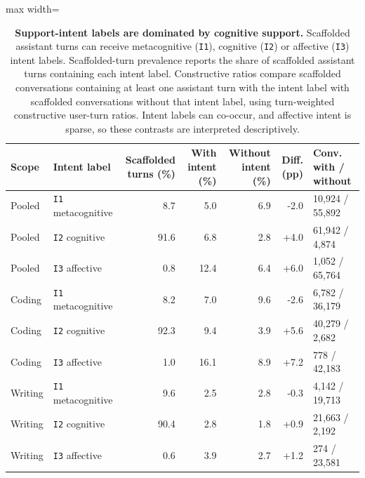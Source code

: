\begin{table}[p]
\centering
\scriptsize
\caption{\textbf{Support-intent labels are dominated by cognitive support.} Scaffolded assistant turns can receive metacognitive (\texttt{I1}), cognitive (\texttt{I2}) or affective (\texttt{I3}) intent labels. Scaffolded-turn prevalence reports the share of scaffolded assistant turns containing each intent label. Constructive ratios compare scaffolded conversations containing at least one assistant turn with the intent label with scaffolded conversations without that intent label, using turn-weighted constructive user-turn ratios. Intent labels can co-occur, and affective intent is sparse, so these contrasts are interpreted descriptively.}
\label{tab:support_intent_summary}
\begin{adjustbox}{max width=\textwidth}
\begin{tabular}{@{}llrrrrl@{}}
\toprule
Scope & Intent label & Scaffolded turns (\%) & With intent (\%) & Without intent (\%) & Diff. (pp) & Conv. with / without \\
\midrule
Pooled & \texttt{I1} metacognitive & 8.7 & 5.0 & 6.9 & -2.0 & 10,924 / 55,892 \\
Pooled & \texttt{I2} cognitive & 91.6 & 6.8 & 2.8 & +4.0 & 61,942 / 4,874 \\
Pooled & \texttt{I3} affective & 0.8 & 12.4 & 6.4 & +6.0 & 1,052 / 65,764 \\
\addlinespace
Coding & \texttt{I1} metacognitive & 8.2 & 7.0 & 9.6 & -2.6 & 6,782 / 36,179 \\
Coding & \texttt{I2} cognitive & 92.3 & 9.4 & 3.9 & +5.6 & 40,279 / 2,682 \\
Coding & \texttt{I3} affective & 1.0 & 16.1 & 8.9 & +7.2 & 778 / 42,183 \\
\addlinespace
Writing & \texttt{I1} metacognitive & 9.6 & 2.5 & 2.8 & -0.3 & 4,142 / 19,713 \\
Writing & \texttt{I2} cognitive & 90.4 & 2.8 & 1.8 & +0.9 & 21,663 / 2,192 \\
Writing & \texttt{I3} affective & 0.6 & 3.9 & 2.7 & +1.2 & 274 / 23,581 \\
\bottomrule
\end{tabular}
\end{adjustbox}
\end{table}
